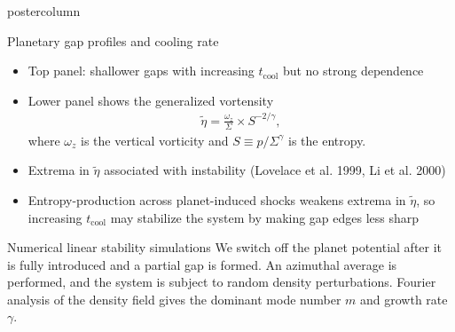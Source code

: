 \documentclass[final,hyperref={pdfpagelabels=false}]{beamer}
\begin{document}
\begin{frame}
\begin{columns}
\begin{column}{.49\textwidth}
\begin{beamercolorbox}[center,wd=\textwidth]{postercolumn}
\begin{minipage}[T]{.95\textwidth}
{\begin{block}{{\Large Planetary gap profiles and cooling
              rate}}
\begin{minipage}[t]{0.49\textwidth}
\begin{figure}
            \end{figure}
          \end{minipage}
          \begin{minipage}[t]{0.49\textwidth}
            \begin{itemize}
            \item Top panel: shallower gaps with increasing $t_\mathrm{cool}$ 
              but no strong dependence 
            \item Lower panel shows the generalized vortensity
              \begin{align*}
                \tilde{\eta} = \frac{\omega_z}{\Sigma}\times S^{-2/\gamma},
              \end{align*}
              where $\omega_z$ is the vertical vorticity and $S\equiv
              p/\Sigma^\gamma$ is the entropy. 
            \item Extrema in $\tilde{\eta}$ associated with
              instability (Lovelace et al. 1999, Li et al. 2000)
            \item Entropy-production across planet-induced shocks
              weakens extrema in $\tilde{\eta}$, so
             increasing $t_\mathrm{cool}$ may stabilize the
              system by making gap edges less sharp
            \end{itemize}
          \end{minipage}
        \end{block}
        \vfill
        \begin{block}{{\Large Numerical linear stability simulations}}
          \justifying
          We switch off the planet potential after it is fully
          introduced and a partial gap is formed. An azimuthal
          average is performed, and the system is subject to random
          density perturbations. Fourier analysis of the density field
          gives the dominant mode number $m$ and growth rate $\gamma$.  
          \\   
          \vspace{-2cm}

\end{block}}
\end{minipage}
\end{beamercolorbox}
\end{column}
\end{columns}
\end{frame}
\end{document}
